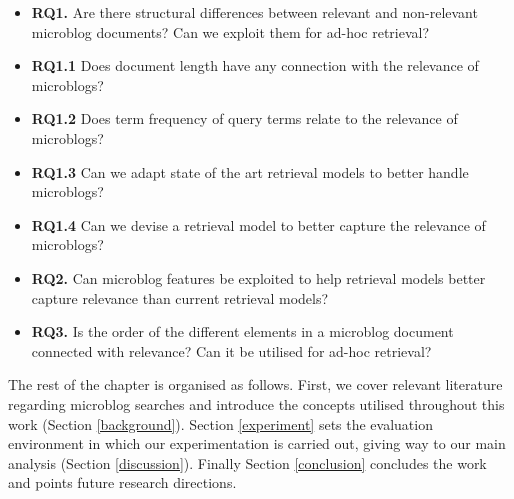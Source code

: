\begin{itemize}

\item[] \textbf{RQ1.} Are there structural differences between relevant and non-relevant microblog documents? Can we exploit them for ad-hoc retrieval?

\item[] \textbf{RQ1.1} Does document length have any connection with the relevance of microblogs?
\item[] \textbf{RQ1.2} Does term frequency of query terms relate to the relevance of microblogs? 
\item[] \textbf{RQ1.3} Can we adapt state of the art retrieval models to better handle microblogs?
\item[] \textbf{RQ1.4} Can we devise a retrieval model to better capture the relevance of microblogs?

\item[] \textbf{RQ2.} Can microblog features be exploited to help retrieval models better capture relevance than current retrieval models?
\item[] \textbf{RQ3.} Is the order of the different elements in a microblog document connected with relevance? Can it be utilised for ad-hoc retrieval?

\end{itemize}

The rest of the chapter is organised as follows. First, we cover relevant literature regarding microblog searches and introduce the concepts utilised throughout this work (Section \ref{background}). Section \ref{experiment} sets the evaluation environment in which our experimentation is carried out, giving way to our main analysis (Section \ref{discussion}). Finally Section \ref{conclusion} concludes the work and points future research directions.

